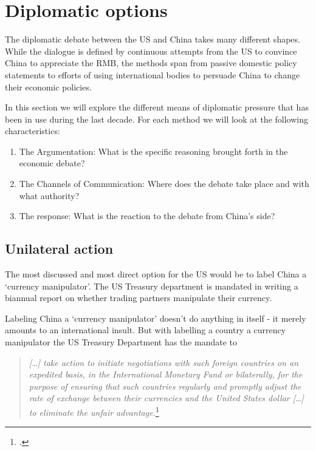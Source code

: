 \section{Diplomatic options}
\label{sec:diplomacy}


The diplomatic debate between the US and China takes many different 
shapes. While the dialogue is defined by continuous attempts from the US 
to convince China to appreciate the RMB, the methods span from passive 
domestic policy statements to efforts of using international bodies to 
persuade China to change their economic policies.

In this section we will explore the different means of diplomatic 
pressure that has been in use during the last decade. For each method we 
will look at the following characteristics:

\begin{enumerate}
	\item{The Argumentation: What is the specific reasoning brought 
		forth in the economic debate?}
	\item{The Channels of Communication: Where does the debate take 
		place and with what authority?}
	\item{The response: What is the reaction to the debate from China's 
		side?}
\end{enumerate}



\subsection{Unilateral action}

The most discussed and most direct option for the US would be to label China a `currency manipulator'. The US Treasury department is mandated in writing a biannual report on whether trading partners manipulate their currency.  

Labeling China a `currency manipulator' doesn't do anything in itself - 
it merely amounts to an international insult. But with labelling a 
country a currency manipulator the US Treasury Department has the 
mandate to
\begin{quotation}
\emph{[\dots] take action to initiate negotiations with such foreign 
	countries on an expedited basis, in the International Monetary Fund 
	or bilaterally, for the purpose of ensuring that such countries 
	regularly and promptly adjust the rate of exchange between their 
	currencies and the United States dollar [\dots] to eliminate the 
unfair advantage.}\footnote{\cite{TradeAct1988}.}
\end{quotation}


